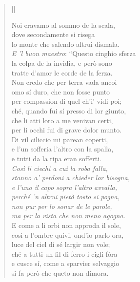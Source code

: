 \documentclass{article}
\begin{document}
\begin{verse}[\versewidth]
  \begin{patverse*}
    Noi eravamo al sommo de la scala,\\
    dove secondamente si risega\\
    lo monte che salendo altrui dismala.\\[10pt]
    \emph{E 'l buon maestro}: ``Questo cinghio sferza\\
    la colpa de la invidia, e però sono\\
    tratte d'amor le corde de la ferza.\\[10pt]
    Non credo che per terra vada ancoi\\
    omo sí duro, che non fosse punto\\
    per compassion di quel ch'i' vidi poi;\\
    ché, quando fui sí presso di lor giunto,\\
    che li atti loro a me venivan certi,\\
    per li occhi fui di grave dolor munto.\\
    Di vil ciliccio mi parean coperti,\\
    e l'un sofferia l'altro con la spalla,\\
    e tutti da la ripa eran sofferti.\\
    \emph{Così li ciechi a cui la roba falla,\\
    stanno a' perdoni a chieder lor bisogna,\\
    e l'uno il capo sopra l'altro avvalla,\\
    perché 'n altrui pietà tosto si pogna,\\
    non pur per lo sonar de le parole,\\
    ma per la vista che non meno agogna.}\\
    E come a li orbi non approda il sole,\\
    così a l'ombre quivi, ond'io parlo ora,\\
    luce del ciel di sé largir non vole;\\
    ché a tutti un fil di ferro i cigli fóra\\
    e cusce sí, come a sparvier selvaggio\\
    si fa però che queto non dimora.
  \end{patverse*}
\end{verse}
\end{document}
